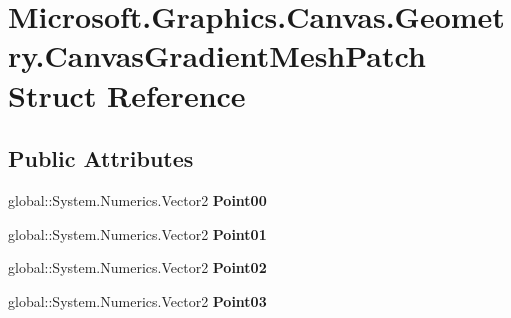 \hypertarget{struct_microsoft_1_1_graphics_1_1_canvas_1_1_geometry_1_1_canvas_gradient_mesh_patch}{}\section{Microsoft.\+Graphics.\+Canvas.\+Geometry.\+Canvas\+Gradient\+Mesh\+Patch Struct Reference}
\label{struct_microsoft_1_1_graphics_1_1_canvas_1_1_geometry_1_1_canvas_gradient_mesh_patch}
\subsection*{Public Attributes}
\begin{DoxyCompactItemize}
\item 
\mbox{\label{struct_microsoft_1_1_graphics_1_1_canvas_1_1_geometry_1_1_canvas_gradient_mesh_patch_a7cb9c717659fd7e9dc54369f1a214c79}} 
global\+::\+System.\+Numerics.\+Vector2 {\bfseries Point00}
\item 
\mbox{\label{struct_microsoft_1_1_graphics_1_1_canvas_1_1_geometry_1_1_canvas_gradient_mesh_patch_adc230d0c20da3689e76aa0cfa136182b}} 
global\+::\+System.\+Numerics.\+Vector2 {\bfseries Point01}
\item 
\mbox{\label{struct_microsoft_1_1_graphics_1_1_canvas_1_1_geometry_1_1_canvas_gradient_mesh_patch_abfd3602793448fb05173b20576ca9b0f}} 
global\+::\+System.\+Numerics.\+Vector2 {\bfseries Point02}
\item 
\mbox{\label{struct_microsoft_1_1_graphics_1_1_canvas_1_1_geometry_1_1_canvas_gradient_mesh_patch_a7261245e665d9b392a23b42a5a9fedc0}} 
global\+::\+System.\+Numerics.\+Vector2 {\bfseries Point03}
\item 
\mbox{\label{struct_microsoft_1_1_graphics_1_1_canvas_1_1_geometry_1_1_canvas_gradient_mesh_patch_aa531179d8964d39f2062efbf64e05f18}} 

\end{DoxyCompactItemize}
